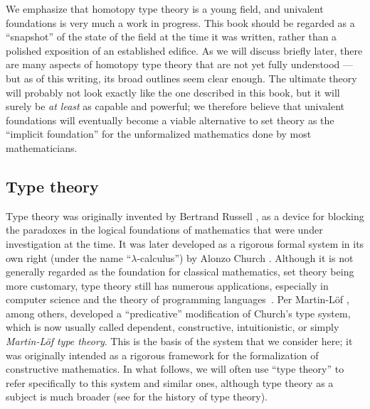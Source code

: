 We emphasize that homotopy type theory is a young field, and univalent foundations is very much a work in progress.
This book should be regarded as a ``snapshot'' of the state of the field at the time it was written, rather than a polished exposition of an established edifice.
As we will discuss briefly later, there are many aspects of homotopy type theory that are not yet fully understood --- but as of this writing, its broad outlines seem clear enough.
The ultimate theory will probably not look exactly like the one described in this book, but it will surely be \emph{at least} as capable and powerful; we therefore believe that univalent foundations will eventually become a viable alternative to set theory as the ``implicit foundation'' for the unformalized mathematics done by most mathematicians.


\subsection*{Type theory}

Type theory was originally invented by Bertrand Russell \cite{Russell:1908}, as a device for blocking the paradoxes in the logical foundations of mathematics  that were under investigation at the time. It was later developed as a rigorous formal system in its own right (under the name ``$\lambda$-calculus'') by Alonzo Church \cite{Church:1933cl,Church:1940tu,Church:1941tc}.  Although it is not generally regarded as the foundation for classical mathematics, set theory being more customary, type theory still has numerous applications, especially in computer science and the theory of programming languages~\cite{Pierce-TAPL}.
%
Per Martin-L\"{o}f \cite{Martin-Lof-1972,martinlof71itt,Martin-Lof-1979,martin-lof:bibliopolis}, among others,
developed a ``predicative'' modification of Church's type system, which is now usually called dependent, constructive, intuitionistic, or simply \emph{Martin\--L\"of type theory}. This is the basis of the system that we consider here; it was originally intended as a rigorous framework for the formalization of constructive mathematics.  In what follows, we will often use ``type theory'' to refer specifically to this system and similar ones, although type theory as a subject is much broader (see \cite{somma,kamar} for the history of type theory).

